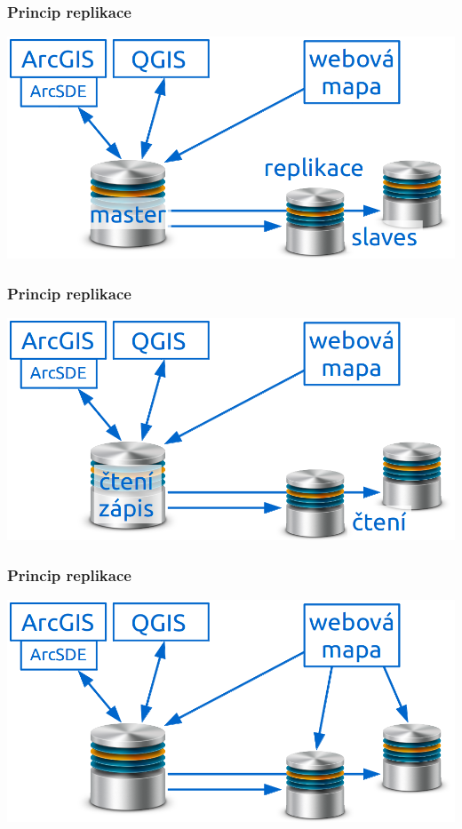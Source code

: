 \documentclass[xcolor=dvipsnames, 14pt]{beamer}
\begin{document}
  \begin{frame}
    \frametitle{Princip replikace}
    \centering
    \includegraphics[scale=0.45]{obr/schema8.png} 
  \end{frame}

  \begin{frame}
    \frametitle{Princip replikace}
    \centering
    \includegraphics[scale=0.45]{obr/schema9.png} 
  \end{frame}

  \begin{frame}
    \frametitle{Princip replikace}
    \centering
    \includegraphics[scale=0.45]{obr/schema10.png} 
  \end{frame}
\end{document}

